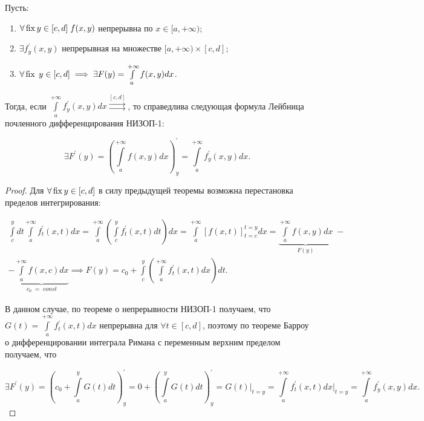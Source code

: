 \documentclass[../../main.tex]{subfiles}
\begin{document}
\begin{thm}
	Пусть: 
	\begin{enumerate}
		\item $\forall \operatorname{fix} y \in [c, d] \; f(x, y)$ непрерывна по $x \in [a, 
		+\infty)$;
		\item $\exists f^{'}_y (x, y)$ непрерывная на множестве $[a, +\infty) \times 
		[c, d]$;
		\item $\forall \operatorname{fix} \; y \in [c, d] \implies \exists F(y) = 
		\int\limits_a^{+\infty} f(x, y) dx$.
	\end{enumerate}
	Тогда, если $\displaystyle \int\limits_a^{+\infty} f^{'}_y (x, y) dx 
	\overset{[c, d]}{\rightrightarrows}$, то справедлива следующая формула 
	Лейбница почленного дифференцирования НИЗОП-1:
	
	\begin{equation} \label{lec11:2}
		\exists F^{'}(y) = \left( \int\limits_a^{+\infty} f(x, y) dx \right)^{'}_y = 
		\int\limits_a^{+\infty} f^{'}_y (x, y) dx. 
	\end{equation}
	
	\begin{proof}
		Для $\forall \operatorname{fix} y \in [c, d]$ в силу предыдущей теоремы возможна 
		перестановка пределов интегрирования:
		
		\begin{equation*}
		\begin{gathered}
		\int\limits_c^y dt \int\limits_a^{+\infty} f^{'}_{t}(x, t) dx =
		\int\limits_a^{+\infty} \left( \int\limits_c^y f^{'}_{t} (x, t) dt \right) 
		dx =
		\int\limits_a^{+\infty} \left[ f(x, t) \right]_{t = c}^{t = y} dx
		= \underbrace{\int\limits_a^{+\infty} f(x, y) dx}_{F(y)}\;- \\
		- \underbrace{\int\limits_a^{+\infty} f (x, c) dx}_{c_0\;=\;const} \implies 
		F(y) = c_0 + \int\limits_c^y \left( \int\limits_a^{+\infty} f^{'}_{t} (x, t) 
		dx \right) dt.
		\end{gathered}
		\end{equation*}
		
		В данном случае, по теореме о непрерывности НИЗОП-1 получаем, что $G(t) = 
		\int\limits_a^{+\infty} f_{t}^{'}(x, t) dx$ непрерывна для $\forall t \in 
		[c, d]$, поэтому по теореме Барроу о дифференцировании интеграла Римана с 
		переменным верхним пределом получаем, что
		
		\[
		\exists F^{'}(y) = \left(c_0 + \int\limits_a^y G(t)dt\right)^{'}_y = 0 + 
		\left(\int\limits_a^y G(t)dt\right)^{'}_y = G(t)\bigg|_{t = y} = 
		\int\limits_a^{+\infty} f^{'}_t (x, t) dx\bigg|_{t = y} = 
		\int\limits^{+\infty}_a  f^{'}_y (x, y) dx.
		\]
	\end{proof}
	
\end{thm}
\end{document}

